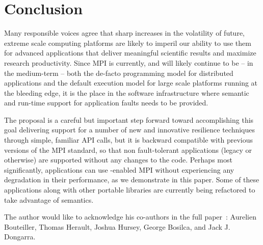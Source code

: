 \section{Conclusion}
\label{sect:conclusion}

Many responsible voices agree that sharp increases in the volatility of future,
extreme scale computing platforms are likely to imperil our ability to use them
for advanced applications that deliver meaningful scientific results and
maximize research productivity. Since MPI is currently, and will likely continue
to be -- in the medium-term -- both the de-facto programming model for
distributed applications and the default execution model for large scale
platforms running at the bleeding edge, it is the place in the software
infrastructure where semantic and run-time support for application faults needs
to be provided.

The \ulfm proposal is a careful but important step forward toward accomplishing
this goal delivering support for a number of new and innovative resilience
techniques through simple, familiar API calls, but it is backward compatible
with previous versions of the MPI standard, so that non fault-tolerant
applications (legacy or otherwise) are supported without any changes to the
code. Perhaps most significantly, applications can use \ulfm-enabled MPI without
experiencing any degradation in their performance, as we demonstrate in this
paper. Some of these applications along with other portable libraries are
currently being refactored to take advantage of \ulfm semantics.

The author would like to acknowledge his co-authors in the full
paper~\cite{Bland:2012tp}: Aurelien Bouteiller, Thomas Herault, Joshua Hursey,
George Bosilca, and Jack J. Dongarra.
